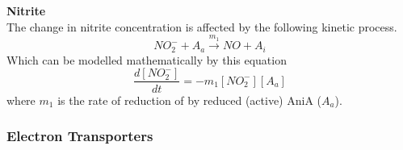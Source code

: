 {\bf Nitrite}\\
The change in nitrite concentration is affected by the following kinetic process.
\begin{equation*}
NO_2^- + A_a \xrightarrow{m_1} NO + A_i
\end{equation*}
Which can be modelled mathematically by this equation
\begin{equation}
\frac{d[NO_2^-]}{dt} = - m_{1}[NO_2^-][A_a]
\label{eq:nitrite}
\end{equation}
where $m_{1}$ is the rate of reduction of \cNitrite{} by reduced (active) AniA ($A_a$).

\subsubsection{Electron Transporters}

